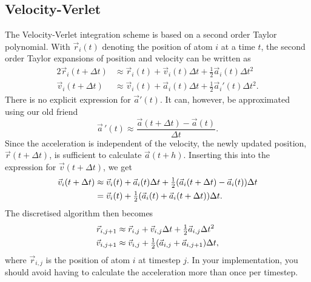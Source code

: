 \documentclass[11pt,british,a4paper]{report}
\begin{document}
\subsection{Velocity-Verlet}\label{app:verlet}
The Velocity-Verlet integration scheme is based on a second order Taylor polynomial. With \(\vec{r}_i(t)\) denoting the position of atom \(i\) at a time \(t\), the second order Taylor expansions of position and velocity can be written as
\begin{alignat*}{2}
    \vec{r}_i(t+\Delta t) &\approx \vec{r}_i(t) + \vec{v}_i(t)\Delta t + \tfrac{1}{2}\vec{a}_i(t)\Delta t^2\\
    \vec{v}_i(t+\Delta t) &\approx \vec{v}_i(t) + \vec{a}_i(t)\Delta t + \tfrac{1}{2}\vec{a}_i'(t)\Delta t^2.
\end{alignat*}
There is no explicit expression for \(\vec{a}'(t)\). It can, however, be approximated using our old friend
\[
\vec{a}\,'(t)\approx\frac{\vec{a}(t+\Delta t)-\vec{a}(t)}{\Delta t}.
\]
Since the acceleration is independent of the velocity, the newly updated position, \(\vec{r}(t+\Delta t)\), is sufficient to calculate \(\vec{a}(t+h)\). Inserting this into the expression for \(\vec{v}(t+\Delta t)\), we get
\begin{alignat*}{2}
    \vec{v}_i(t+\Delta t) &\approx \vec{v}_i(t) + \vec{a}_i(t)\Delta t + \tfrac{1}{2}\qty(\vec{a}_i(t+\Delta t)-\vec{a}_i(t))\Delta t\\
    &= \vec{v}_i(t) + \tfrac{1}{2}\qty(\vec{a}_i(t)+\vec{a}_i(t+\Delta t))\Delta t.
\end{alignat*}
The discretised algorithm then becomes
\begin{alignat*}{2}
    \vec{r}_{i,j+1} &\approx \vec{r}_{i,j} + \vec{v}_{i,j}\Delta t + \tfrac{1}{2}\vec{a}_{i,j}\Delta t^2\\
    \vec{v}_{i,j+1} &\approx \vec{v}_{i,j} + \tfrac{1}{2}\qty(\vec{a}_{i,j} + \vec{a}_{i,j+1})\Delta t,
\end{alignat*}
where \(\vec{r}_{i,j}\) is the position of atom \(i\) at timestep \(j\). In your implementation, you should avoid having to calculate the acceleration more than once per timestep.
\end{document}
